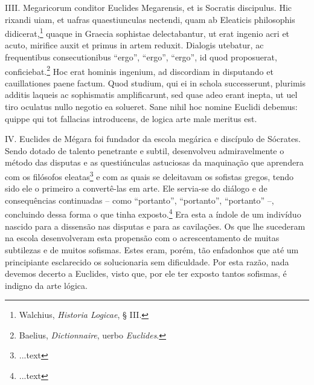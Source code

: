 \documentclass{article}
\begin{document}
\begin{paracol}{3}
\begin{nthcolumn}{2}
  \end{nthcolumn}
  \vspace{0.5cm}
  \begin{nthcolumn*}{0} %
    IIII. Megaricorum conditor Euclides Megarensis, et is Socratis discipulus. Hic rixandi uiam, et uafras quaestiunculas nectendi, quam ab Eleaticis philosophis didicerat,\footnote[24]{Walchius, \emph{Historia Logicae}, § III.} quaque in Graecia sophistae delectabantur, ut erat ingenio acri et acuto, mirifice auxit et primus in artem reduxit. Dialogis utebatur, ac frequentibus consecutionibus “ergo”, “ergo”, “ergo”, id quod proposuerat, conficiebat.\footnote[25]{Baelius, \emph{Dictionnaire}, uerbo \emph{Euclides}.} Hoc erat hominis ingenium, ad discordiam in disputando et cauillationes paene factum. Quod studium, qui ei in schola successerunt, plurimis additis laqueis ac sophismatis amplificarunt, sed quae adeo erant inepta, ut uel tiro oculatus nullo negotio ea solueret. Sane nihil hoc nomine Euclidi debemus: quippe qui tot fallacias introducens, de logica arte male meritus est.
  \end{nthcolumn*}
  \vspace{0.5cm}
  \begin{nthcolumn}{1} %
    IV. Euclides de Mégara foi fundador da escola megárica e discípulo de Sócrates. Sendo dotado de talento penetrante e subtil, desenvolveu admiravelmente o método das disputas e as questiúnculas astuciosas da maquinação que aprendera com os filósofos eleatas\footnote[24]{...text} e com as quais se deleitavam os sofistas gregos, tendo sido ele o primeiro a convertê-las em arte. Ele servia-se do diálogo e de consequências continuadas – como “portanto”, “portanto”, “portanto” –, concluindo dessa forma o que tinha exposto.\footnote[25]{...text} Era esta a índole de um indivíduo nascido para a dissensão nas disputas e para as cavilações. Os que lhe sucederam na escola desenvolveram esta propensão com o acrescentamento de muitas subtilezas e de muitos sofismas. Estes eram, porém, tão enfadonhos que até um principiante esclarecido os solucionaria sem dificuldade. Por esta razão, nada devemos decerto a Euclides, visto que, por ele ter exposto tantos sofismas, é indigno da arte lógica.
  \end{nthcolumn}
  \vspace{0.5cm}
  \begin{nthcolumn}{2} %

\end{nthcolumn}
\end{paracol}
\end{document}
